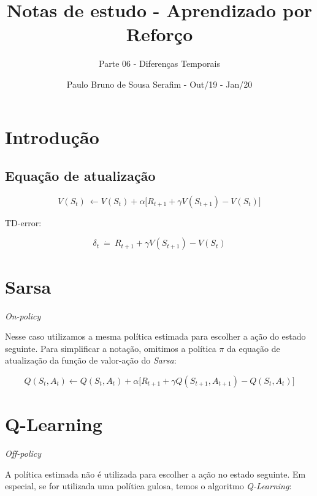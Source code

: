\documentclass{article}
\title{Notas de estudo - Aprendizado por Reforço}
\author{Parte 06 - Diferenças Temporais}
\date{Paulo Bruno de Sousa Serafim - Out/19 - Jan/20}
\begin{document}
\maketitle

    \section{Introdução}
    
        \subsection{Equação de atualização}
        
            \begin{equation}
                V(S_t) \ \leftarrow V(S_t) + \alpha \Big[ R_{t+1} + \gamma V(S_{t+1}) - V(S_t) \Big]
            \end{equation}
        
            TD-error:
            
            \begin{equation}
                \delta_t \ \dot{=} \ R_{t+1} + \gamma V(S_{t+1}) - V(S_t)
            \end{equation}
        
    \section{Sarsa}
    
        \textit{On-policy}
    
        Nesse caso utilizamos a mesma política estimada para escolher a ação do estado seguinte. Para simplificar a notação, omitimos a política $\pi$ da equação de atualização da função de valor-ação do \textit{Sarsa}:
    
        \begin{equation}
            Q(S_t, A_t) \leftarrow Q(S_t, A_t) + \alpha \Big[ R_{t+1} + \gamma Q(S_{t+1}, A_{t+1}) - Q(S_t, A_t) \Big]
        \end{equation}
        
    \section{Q-Learning}
    
        \textit{Off-policy}
        
        A política estimada não é utilizada para escolher a ação no estado seguinte. Em especial, se for utilizada uma política gulosa, temos o algoritmo \textit{Q-Learning}:
    
\end{document}
